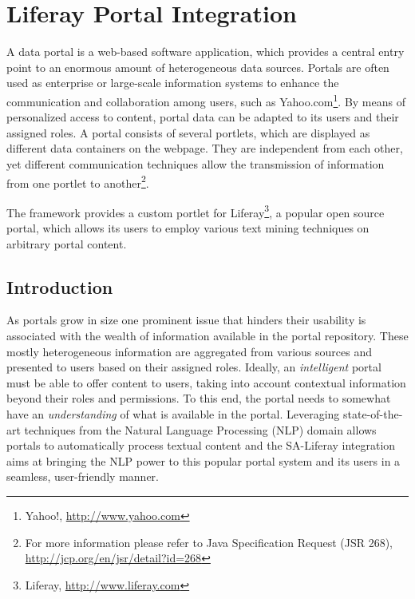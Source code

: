 %
%
%   
% 

\chapter{Liferay Portal Integration}
\label{chap:liferay}
A data portal is a web-based software application, which provides a central entry point to an enormous amount of heterogeneous data sources. Portals are often used as enterprise or large-scale information systems to enhance the communication and collaboration among users, such as Yahoo.com\footnote{Yahoo!, \url{http://www.yahoo.com}}. By means of personalized access to content, portal data can be adapted to its users and their assigned roles. A portal consists of several portlets, which are displayed as different data containers on the webpage. They are independent from each other, yet different communication techniques allow the transmission of information from one portlet to another\footnote{For more information please refer to Java Specification Request (JSR 268), \url{http://jcp.org/en/jsr/detail?id=268}}.

The \sa framework provides a custom portlet for Liferay\footnote{Liferay, \url{http://www.liferay.com}}, a popular open source portal, which allows its users to employ various text mining techniques on arbitrary portal content.

\section{Introduction}
As portals grow in size one prominent issue that hinders their usability is associated with the wealth of information available in the portal repository. These mostly heterogeneous information are aggregated from various sources and presented to users based on their assigned roles. Ideally, an \emph{intelligent} portal must be able to offer content to users, taking into account contextual information beyond their roles and permissions. To this end, the portal needs to somewhat have an \emph{understanding} of what is available in the portal. Leveraging state-of-the-art techniques from the Natural Language Processing (NLP) domain allows portals to automatically process textual content and the SA-Liferay integration aims at bringing the NLP power to this popular portal system and its users in a seamless, user-friendly manner.

